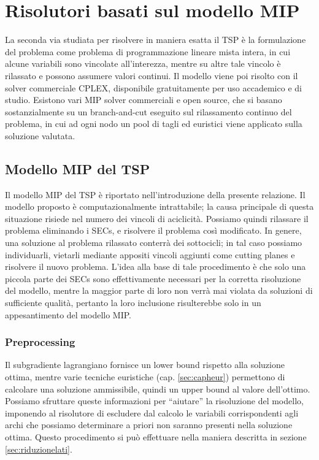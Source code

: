 \chapter{Risolutori basati sul modello MIP}
La seconda via studiata per risolvere in maniera esatta il TSP è la formulazione del problema come problema di programmazione lineare mista intera, in cui alcune variabili sono vincolate all'interezza, mentre su altre tale vincolo è rilassato e possono assumere valori continui. Il modello viene poi risolto con il solver commerciale CPLEX, disponibile gratuitamente per uso accademico e di studio. Esistono vari MIP solver commerciali e open source, che si basano sostanzialmente su un branch-and-cut eseguito sul rilassamento continuo del problema, in cui ad ogni nodo un pool di tagli ed euristici viene applicato sulla soluzione valutata.

\section{Modello MIP del TSP}\label{sec:relaxelsecs}
Il modello MIP del TSP è riportato nell'introduzione della presente relazione. Il modello proposto è computazionalmente intrattabile; la causa principale di questa situazione risiede nel numero dei vincoli di aciclicità. Possiamo quindi rilassare il problema eliminando i SECs, e risolvere il problema così modificato. In genere, una soluzione al problema rilassato conterrà dei sottocicli; in tal caso possiamo individuarli, vietarli mediante appositi vincoli aggiunti come cutting planes e risolvere il nuovo problema. L'idea alla base di tale procedimento è che solo una piccola parte dei SECs sono effettivamente necessari per la corretta risoluzione del modello, mentre la maggior parte di loro non verrà mai violata da soluzioni di sufficiente qualità, pertanto la loro inclusione risulterebbe solo in un appesantimento del modello MIP.

\subsection{Preprocessing}
Il subgradiente lagrangiano fornisce un lower bound rispetto alla soluzione ottima, mentre varie tecniche euristiche (cap. \ref{sec:capheur}) permettono di calcolare una soluzione ammissibile, quindi un upper bound al valore dell'ottimo. Possiamo sfruttare queste informazioni per ``aiutare'' la risoluzione del modello, imponendo al risolutore di escludere dal calcolo le variabili corrispondenti agli archi che possiamo determinare a priori non saranno presenti nella soluzione ottima. Questo procedimento si può effettuare nella maniera descritta in sezione \ref{sec:riduzionelati}.

